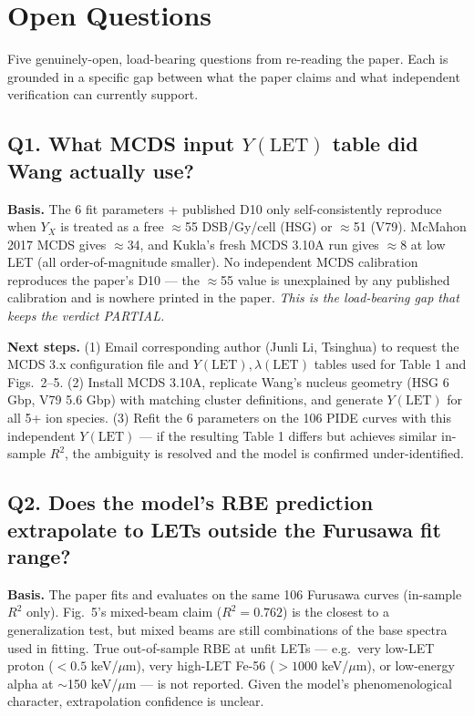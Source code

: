 \section{Open Questions}

Five genuinely-open, load-bearing questions from re-reading the paper. Each is grounded in a specific gap between what the paper claims and what independent verification can currently support.

\subsection*{Q1. What MCDS input $Y(\text{LET})$ table did Wang actually use?}

\textbf{Basis.} The 6 fit parameters + published D10 only self-consistently reproduce when $Y_X$ is treated as a free $\approx$55 DSB/Gy/cell (HSG) or $\approx$51 (V79). McMahon 2017 MCDS gives $\approx$34, and Kukla's fresh MCDS 3.10A run gives $\approx$8 at low LET (all order-of-magnitude smaller). No independent MCDS calibration reproduces the paper's D10 --- the $\approx$55 value is unexplained by any published calibration and is nowhere printed in the paper. \emph{This is the load-bearing gap that keeps the verdict PARTIAL.}

\textbf{Next steps.} (1) Email corresponding author (Junli Li, Tsinghua) to request the MCDS 3.x configuration file and $Y(\text{LET}), \lambda(\text{LET})$ tables used for Table 1 and Figs.\ 2--5. (2) Install MCDS 3.10A, replicate Wang's nucleus geometry (HSG 6 Gbp, V79 5.6 Gbp) with matching cluster definitions, and generate $Y(\text{LET})$ for all 5+ ion species. (3) Refit the 6 parameters on the 106 PIDE curves with this independent $Y(\text{LET})$ --- if the resulting Table 1 differs but achieves similar in-sample $R^2$, the ambiguity is resolved and the model is confirmed under-identified.

\subsection*{Q2. Does the model's RBE prediction extrapolate to LETs outside the Furusawa fit range?}

\textbf{Basis.} The paper fits and evaluates on the same 106 Furusawa curves (in-sample $R^2$ only). Fig.\ 5's mixed-beam claim ($R^2=0.762$) is the closest to a generalization test, but mixed beams are still combinations of the base spectra used in fitting. True out-of-sample RBE at unfit LETs --- e.g.\ very low-LET proton ($<0.5$ keV/$\mu$m), very high-LET Fe-56 ($>1000$ keV/$\mu$m), or low-energy alpha at $\sim$150 keV/$\mu$m --- is not reported. Given the model's phenomenological character, extrapolation confidence is unclear.

